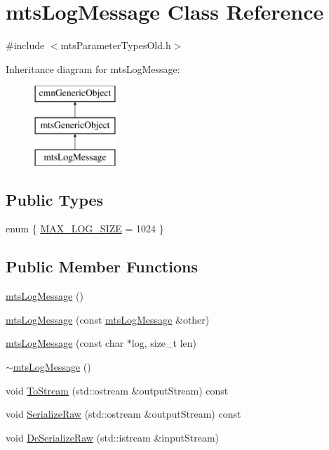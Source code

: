\hypertarget{classmts_log_message}{\section{mts\-Log\-Message Class Reference}
\label{classmts_log_message}
}


{\ttfamily \#include $<$mts\-Parameter\-Types\-Old.\-h$>$}

Inheritance diagram for mts\-Log\-Message\-:\begin{figure}[H]
\begin{center}
\leavevmode
\includegraphics[height=3.000000cm]{d8/dee/classmts_log_message}
\end{center}
\end{figure}
\subsection*{Public Types}
\begin{DoxyCompactItemize}
\item 
enum \{ \hyperlink{classmts_log_message_a19f4c6a6fa57d414f267a4006ed7e97ca547ed9439424c96af36d3e0cc57fc891}{M\-A\-X\-\_\-\-L\-O\-G\-\_\-\-S\-I\-Z\-E} = 1024
 \}
\end{DoxyCompactItemize}
\subsection*{Public Member Functions}
\begin{DoxyCompactItemize}
\item 
\hyperlink{classmts_log_message_a270deb429b3a209c6c6b26e55e8c8a46}{mts\-Log\-Message} ()
\item 
\hyperlink{classmts_log_message_aa72552abea44ba2d48f351a1acaa3cdf}{mts\-Log\-Message} (const \hyperlink{classmts_log_message}{mts\-Log\-Message} \&other)
\item 
\hyperlink{classmts_log_message_a73a4511c0a3dd0729fcc5cbfd5593154}{mts\-Log\-Message} (const char $\ast$log, size\-\_\-t len)
\item 
\hyperlink{classmts_log_message_ac0d74f78bf113f58bfd4796e06ad7ebd}{$\sim$mts\-Log\-Message} ()
\item 
void \hyperlink{classmts_log_message_a234a9cebef2ebab0db24e956cdeeba9c}{To\-Stream} (std\-::ostream \&output\-Stream) const 
\item 
void \hyperlink{classmts_log_message_a97fefe08731308f488ff104be62df7c1}{Serialize\-Raw} (std\-::ostream \&output\-Stream) const 
\item 
void \hyperlink{classmts_log_message_aa2d8c81db33fc85ad263f705d3a99c7f}{De\-Serialize\-Raw} (std\-::istream \&input\-Stream)
\end{DoxyCompactItemize}
